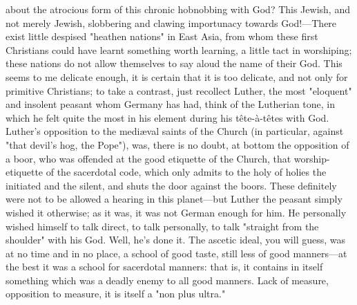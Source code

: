 \documentclass[12pt]{article}
\begin{document}
about the atrocious form of this chronic hobnobbing with God? This Jewish, and not merely Jewish, slobbering and clawing importunacy towards God!---There exist little despised "heathen nations" in East Asia, from whom these first Christians could have learnt something worth learning, a little tact in worshiping; these nations do not allow themselves to say aloud the name of their God. This seems to me delicate enough, it is certain that it is too delicate, and not only for primitive Christians; to take a contrast, just recollect Luther, the most "eloquent" and insolent peasant whom Germany has had, think of the Lutherian tone, in which he felt quite the most in his element during his tête-à-têtes with God. Luther's opposition to the mediæval saints of the Church (in particular, against "that devil's hog, the Pope"), was, there is no doubt, at bottom the opposition of a boor, who was offended at the good etiquette of the Church, that worship-etiquette of the sacerdotal code, which only admits to the holy of holies the initiated and the silent, and shuts the door against the boors. These definitely were not to be allowed a hearing in this planet---but Luther the peasant simply wished it otherwise; as it was, it was not German enough for him. He personally wished himself to talk direct, to talk personally, to talk "straight from the shoulder" with his God. Well, he's done it. The ascetic ideal, you will guess, was at no time and in no place, a school of good taste, still less of good manners---at the best it was a school for sacerdotal manners: that is, it contains in itself something which was a deadly enemy to all good manners. Lack of measure, opposition to measure, it is itself a "non plus ultra."
\end{document}
